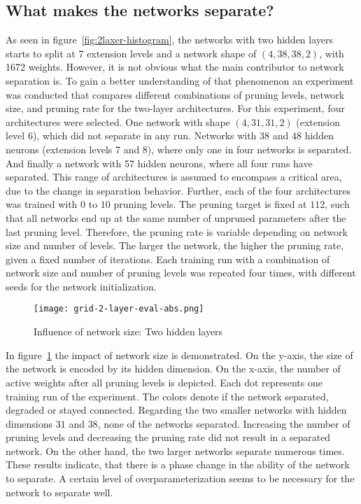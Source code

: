 \subsection{What makes the networks separate?}
As seen in figure~\ref{fig:2laxer-histogram}, the networks with two hidden layers starts to split at 7 extension levels and a network shape of $(4,38,38,2)$, with 1672 weights.
However, it is not obvious what the main contributor to network separation is.
To gain a better understanding of that phenomenon an experiment was conducted that compares different combinations of pruning levels, network size, and pruning rate for the two-layer architectures.
For this experiment, four architectures were selected.
One network with shape $(4,31,31,2)$ (extension level 6), which did not separate in any run.
Networks with $38$ and $48$ hidden neurons (extension levels 7 and 8), where only one in four networks is separated.
And finally a network with 57 hidden neurons, where all four runs have separated.
This range of architectures is assumed to encompass a critical area, due to the change in separation behavior.
Further, each of the four architectures was trained with $0$ to $10$ pruning levels.
The pruning target is fixed at $112$, such that all networks end up at the same number of unpruned parameters after the last pruning level.
Therefore, the pruning rate is variable depending on network size and number of levels.
The larger the network, the higher the pruning rate, given a fixed number of iterations.
Each training run with a combination of network size and number of pruning levels was repeated four times, with different seeds for the network initialization.

\begin{figure}[ht] %
    \centering
    \texttt{[image: grid-2-layer-eval-abs.png]}
    \caption{Influence of network size: Two hidden layers}\label{fig:grid-1}
\end{figure}

In figure~\ref{fig:grid-1} the impact of network size is demonstrated.
On the y-axis, the size of the network is encoded by its hidden dimension.
On the x-axis, the number of active weights after all pruning levels is depicted.
Each dot represents one training run of the experiment.
The colors denote if the network separated, degraded or stayed connected.
Regarding the two smaller networks with hidden dimensions $31$ and $38$, none of the networks separated. 
Increasing the number of pruning levels and decreasing the pruning rate did not result in a separated network.
On the other hand, the two larger networks separate numerous times.
These results indicate, that there is a phase change in the ability of the network to separate.
A certain level of overparameterization seems to be necessary for the network to separate well.

